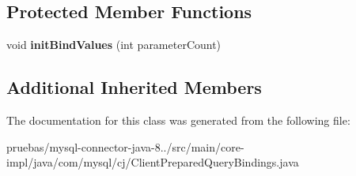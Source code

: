\subsection*{Protected Member Functions}
\begin{DoxyCompactItemize}
\item 
\mbox{\label{classcom_1_1mysql_1_1cj_1_1_client_prepared_query_bindings_a481b1741c1623a59bfddf6899180187c}} 
void {\bfseries init\+Bind\+Values} (int parameter\+Count)
\end{DoxyCompactItemize}
\subsection*{Additional Inherited Members}


The documentation for this class was generated from the following file\+:\begin{DoxyCompactItemize}
\item 
pruebas/mysql-\/connector-\/java-\/8../src/main/core-\/impl/java/com/mysql/cj/Client\+Prepared\+Query\+Bindings.\+java\end{DoxyCompactItemize}

